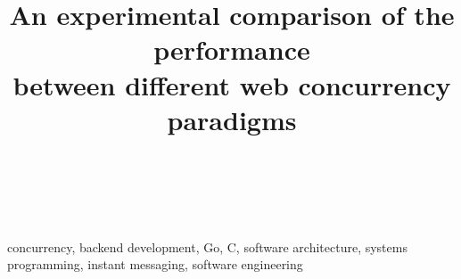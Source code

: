 \documentclass[journal]{IEEEtran}
\begin{document}
\title{An experimental comparison of the performance \\between different web concurrency paradigms}

\author{\\
\\
}

\maketitle


\begin{IEEEkeywords}
concurrency, backend development, Go, C, software architecture, systems programming, instant messaging, software engineering
\end{IEEEkeywords}






%



\nocite{*}

\end{document}
